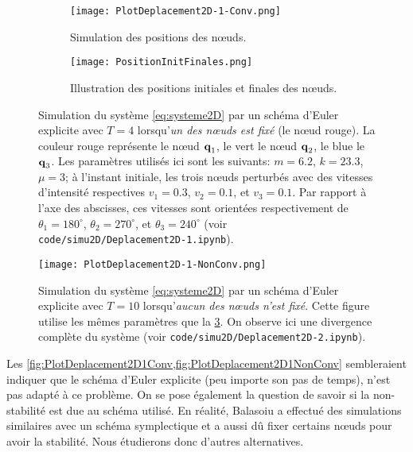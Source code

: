 \begin{figure}[!h]
    \begin{subfigure}[b]{0.7\textwidth}
        \centering
        \texttt{[image: PlotDeplacement2D-1-Conv.png]}
        \caption{Simulation des positions des n\oe{}uds.}
        \label{fig:dep}
    \end{subfigure}
    \begin{subfigure}[b]{0.7\textwidth}
        \centering
        \texttt{[image: PositionInitFinales.png]}
        \caption{Illustration des positions initiales et finales des n\oe{}uds.}
        \label{fig:pos}
    \end{subfigure}
    \caption{Simulation du système \ref{eq:systeme2D} par un schéma d'Euler explicite avec $T = 4$ lorsqu'\textit{un des n\oe{}uds est fixé} (le n\oe{}ud rouge). La couleur rouge représente le n\oe{}ud $\bm{\mathrm{q}}_1$, le vert le n\oe{}ud $\bm{\mathrm{q}}_2$, le blue le $\bm{\mathrm{q}}_3$. Les paramètres utilisés ici sont les suivants: $m=6.2$, $k=23.3$, $\mu=3$; à l'instant initiale, les trois n\oe{}uds perturbés avec des vitesses d'intensité respectives $v_1=0.3$, $v_2=0.1$, et $v_3=0.1$. Par rapport à l'axe des abscisses, ces vitesses sont orientées respectivement de $\theta_1=180^\circ$, $\theta_2=270^\circ$, et $\theta_3=240^\circ$ (voir \texttt{code/simu2D/Deplacement2D-1.ipynb}).}
    \label{fig:PlotDeplacement2D1Conv}
\end{figure}


\begin{figure}[!h]
    \centering
    \texttt{[image: PlotDeplacement2D-1-NonConv.png]}
    \caption{Simulation du système \ref{eq:systeme2D} par un schéma d'Euler explicite avec $T = 10$ lorsqu'\textit{aucun des n\oe{}uds n'est fixé}. Cette figure utilise les mêmes paramètres que la \cref{fig:PlotDeplacement2D1Conv}. On observe ici une divergence complète du système (voir \texttt{code/simu2D/Deplacement2D-2.ipynb}).}
    \label{fig:PlotDeplacement2D1NonConv}
\end{figure}

Les \cref{fig:PlotDeplacement2D1Conv,fig:PlotDeplacement2D1NonConv} sembleraient indiquer que le schéma d'Euler explicite (peu importe son pas de temps), n'est pas adapté à ce problème. On se pose également la question de savoir si la non-stabilité est due au schéma utilisé. En réalité, Balasoiu \parencite{balasoiu2020halthesis} a effectué des simulations similaires avec un schéma symplectique et a aussi dû fixer certains n\oe{}uds pour avoir la stabilité. Nous étudierons donc d'autres alternatives. 

